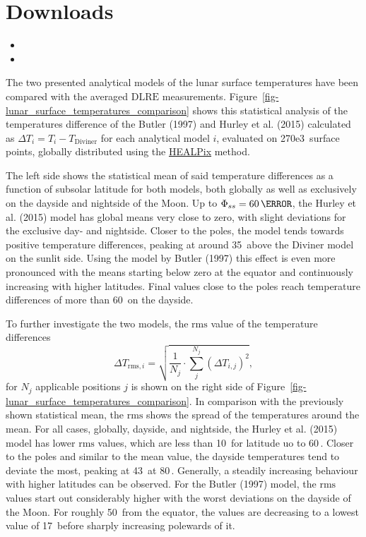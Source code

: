 \documentclass[
    fontsize=10pt,
    twoside=off,
    english,
]{scrbook}
\numberwithin{equation}{chapter}
\theoremstyle{break}
\theoremstyle{nonumberplain}
\begin{document}
\section{Downloads}

\begin{itemize}
\item
\item
\end{itemize}



The two presented analytical models of the lunar surface temperatures
have been compared with the averaged \(\mathrm{DLRE}\) measurements.
Figure~\ref{fig-lunar_surface_temperatures_comparison} shows this
statistical analysis of the temperatures difference of the Butler (1997)
and Hurley et al. (2015) calculated as
\(\Delta T_i = T_i - T_\text{Diviner}\) for each analytical model \(i\),
evaluated on 270e3\,\mathrm{} surface points, globally distributed using
the \href{/documentation/math_num_comp/numerical_grids.qmd}{HEALPix}
method.

The left side shows the statistical mean of said temperature differences
as a function of subsolar latitude for both models, both globally as
well as exclusively on the dayside and nightside of the Moon. Up to
\(\Phi_{ss}=60\,\mathrm{\degree}\), the Hurley et al. (2015) model has
global means very close to zero, with slight deviations for the
exclusive day- and nightside. Closer to the poles, the model tends
towards positive temperature differences, peaking at around
35\, above the Diviner model on the sunlit side. Using the
model by Butler (1997) this effect is even more pronounced with the
means starting below zero at the equator and continuously increasing
with higher latitudes. Final values close to the poles reach temperature
differences of more than 60\, on the dayside.

To further investigate the two models, the \(\mathrm{rms}\) value of the
temperature differences \begin{equation}
    \Delta T_{\text{rms}, i} = \sqrt{\frac{1}{N_j} \cdot \sum_j^{N_j} \left(\Delta T_{i,j}\right)^2},
\end{equation} for \(N_j\) applicable positions \(j\) is shown on the
right side of Figure~\ref{fig-lunar_surface_temperatures_comparison}. In
comparison with the previously shown statistical mean, the
\(\mathrm{rms}\) shows the spread of the temperatures around the mean.
For all cases, globally, dayside, and nightside, the Hurley et al.
(2015) model has lower \(\mathrm{rms}\) values, which are less than
10\, for latitude uo to 60\,\mathrm{\degree}. Closer to the
poles and similar to the mean value, the dayside temperatures tend to
deviate the most, peaking at 43\, at 80\,\mathrm{\degree}.
Generally, a steadily increasing behaviour with higher latitudes can be
observed. For the Butler (1997) model, the \(\mathrm{rms}\) values start
out considerably higher with the worst deviations on the dayside of the
Moon. For roughly 50\,\mathrm{\degree} from the equator, the values are
decreasing to a lowest value of 17\, before sharply increasing
polewards of it.
\end{document}
